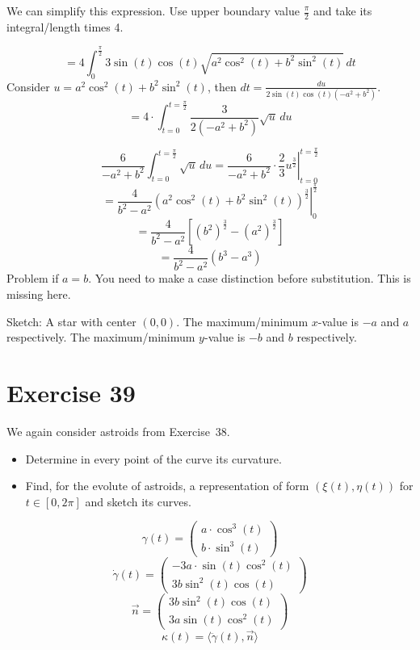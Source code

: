 \documentclass[a4paper]{article}
\theoremstyle{definition}
\begin{document}
We can simplify this expression. Use upper boundary value $\frac\pi2$ and take its integral/length times 4.

\[ = 4 \int_0^{\frac\pi2} 3 \sin(t) \cos(t) \sqrt{a^2 \cos^2(t) + b^2 \sin^2(t)} \, dt \]
Consider $u = a^2 \cos^2(t) + b^2 \sin^2(t)$, then $dt = \frac{du}{2 \sin(t) \cos(t) (-a^2 + b^2)}$.
\[ = 4 \cdot \int_{t=0}^{t=\frac\pi2} \frac{3}{2(-a^2 + b^2)} \sqrt{u} \, du \]

\[ \frac{6}{-a^2 + b^2} \int_{t=0}^{t=\frac\pi2} \sqrt{u} \, du = \left. \frac{6}{-a^2 + b^2} \cdot \frac23 u^{\frac32} \right|_{t=0}^{t=\frac\pi2} \]
\[ = \left. \frac{4}{b^2 - a^2} \left(a^2 \cos^2(t) + b^2 \sin^2(t)\right)^{\frac32} \right|_{0}^{\frac\pi2} \]
\[ = \frac4{b^2 - a^2} \left[\left(b^2\right)^{\frac32} - \left(a^2\right)^{\frac32}\right] \]
\[ = \frac{4}{b^2 - a^2} (b^3 - a^3) \]
Problem if $a = b$. You need to make a case distinction before substitution. This is missing here.

Sketch: A star with center $(0, 0)$. The maximum/minimum $x$-value is $-a$ and $a$ respectively. The maximum/minimum $y$-value is $-b$ and $b$ respectively.

\section{Exercise 39}
\begin{ex}
  We again consider astroids from Exercise~38.
  \begin{itemize}
  \item Determine in every point of the curve its curvature.
  \item Find, for the evolute of astroids, a representation of form $(\xi(t), \eta(t))$ for $t \in [0,2\pi]$ and sketch its curves.
  \end{itemize}
\end{ex}

\[ \gamma(t) = \begin{pmatrix} a \cdot \cos^3(t) \\ b \cdot \sin^3(t) \end{pmatrix} \]
\[ \dot\gamma(t) = \begin{pmatrix} -3a \cdot \sin(t) \cos^2(t) \\ 3b \sin^2(t) \cos(t) \end{pmatrix} \]
\[ \vec{n} = \begin{pmatrix} 3b \sin^2(t) \cos(t) \\ 3a \sin(t) \cos^2(t) \end{pmatrix} \]
\[ \kappa(t) = \langle \ddot{\gamma}(t), \vec{n}\rangle \]
\end{document}
